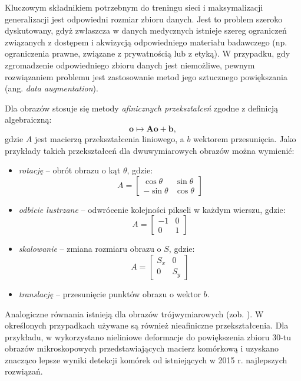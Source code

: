 Kluczowym składnikiem potrzebnym do treningu sieci i maksymalizacji generalizacji jest odpowiedni rozmiar zbioru danych. Jest to problem szeroko dyskutowany, gdyż zwłaszcza w danych medycznych istnieje szereg ograniczeń związanych z dostępem i akwizycją odpowiedniego materiału badawczego (np. ograniczenia prawne, związane z prywatnością lub z etyką). W przypadku, gdy zgromadzenie odpowiedniego zbioru danych jest niemożliwe, pewnym rozwiązaniem problemu jest zastosowanie metod jego sztucznego powiększania (ang. \textit{data augmentation}).

Dla obrazów stosuje się metody \textit{afinicznych przekształceń} zgodne z definicją algebraiczną:
\begin{equation}
	\mathbf o \mapsto \mathbf{Ao} + \mathbf b,
\end{equation}
gdzie $A$ jest macierzą przekształcenia liniowego, a $b$ wektorem przesunięcia. Jako przykłady takich przekształceń dla dwuwymiarowych obrazów można wymienić:
\begin{itemize}[noitemsep,nolistsep]
	\item \textit{rotację} -- obrót obrazu o kąt $\theta$, gdzie:
	\begin{equation}
	A = \begin{bmatrix} 
	\cos \theta & \sin \theta\\
	-\sin \theta & \cos \theta
	\end{bmatrix}
	\end{equation}	
	\item \textit{odbicie lustrzane} -- odwrócenie kolejności pikseli w każdym wierszu, gdzie:
	\begin{equation}
		A = \begin{bmatrix} 
		-1 & 0\\
		0 & 1
	\end{bmatrix}
	\end{equation}
	\item \textit{skalowanie} -- zmiana rozmiaru obrazu o $S$, gdzie:
	\begin{equation}
			A = \begin{bmatrix} 
		S_x & 0\\
		0 & S_y
	\end{bmatrix}
	\end{equation}
	\item \textit{translację} -- przesunięcie punktów obrazu o wektor $b$.
\end{itemize}

Analogiczne równania istnieją dla obrazów trójwymiarowych (zob. \cite{Hill06}). W określonych przypadkach używane są również nieafiniczne przekształcenia. Dla przykładu, w \cite{DBLP:journals/corr/RonnebergerFB15} wykorzystano nieliniowe deformacje do powiększenia zbioru 30-tu obrazów mikroskopowych przedstawiających macierz komórkową i uzyskano znacząco lepsze wyniki detekcji komórek od istniejących w 2015 r. najlepszych rozwiązań.

